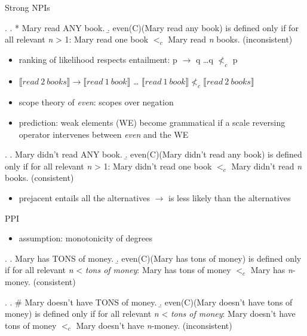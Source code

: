 \documentclass[ignorenonframetext,]{beamer}
\providecommand{\tightlist}{%
  \setlength{\itemsep}{0pt}\setlength{\parskip}{0pt}}
\begin{document}
\begin{frame}{Strong NPIs}

\ex. \a. * Mary read ANY book. \b. even(C)(Mary read any book) is
defined only if for all relevant \emph{n} \textgreater{} 1: Mary read
one book \(<_c\) Mary read \emph{n} books. \hfill (inconsistent)

\begin{itemize}
\tightlist
\item
  ranking of likelihood respects entailment: p \(\rightarrow\) q
  \ldots q \(\not<_c\) p
\item
  \(\llbracket read\ 2\ books\rrbracket \rightarrow \llbracket read\ 1\ book\rrbracket\)
  \ldots{}
  \(\llbracket read\ 1\ book\rrbracket \not<_c \llbracket read\ 2\ books\rrbracket\)
\end{itemize}

\end{frame}

\begin{frame}

\begin{itemize}
\tightlist
\item
  scope theory of \emph{even}: scopes over negation
\item
  prediction: weak elements (WE) become grammatical if a scale reversing
  operator intervenes between \emph{even} and the WE
\end{itemize}

\ex. \a. Mary didn't read ANY book. \b. even(C)(Mary didn't read any
book) is defined only if for all relevant \emph{n} \textgreater{} 1:
Mary didn't read one book \(<_c\) Mary didn't read \emph{n} books.
\hfill (consistent)

\begin{itemize}
\tightlist
\item
  prejacent entails all the alternatives \(\rightarrow\) is less likely
  than the alternatives
\end{itemize}

\end{frame}

\begin{frame}{PPI}

\begin{itemize}
\tightlist
\item
  assumption: monotonicity of degrees
\end{itemize}

\ex. \a. Mary has TONS of money. \b. even(C)(Mary has tons of money) is
defined only if for all relevant \emph{n} \textless{} \emph{tons of
money}: Mary has tons of money \(<_c\) Mary has \emph{n}-money.
\hfill (consistent)

\ex. \a. \# Mary doesn't have TONS of money. \b. even(C)(Mary doesn't
have tons of money) is defined only if for all relevant \emph{n}
\textless{} \emph{tons of money}: Mary doesn't have tons of money
\(<_c\) Mary doesn't have \emph{n}-money. \hfill (inconsistent)

\end{frame}
\end{document}
